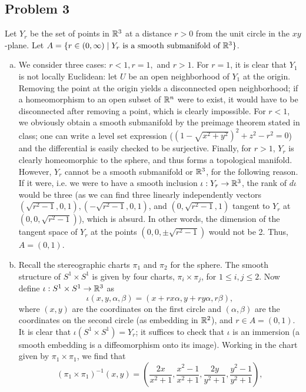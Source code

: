 \documentclass{../mathnotes}
\begin{document}
\subsection*{Problem 3}
Let $Y_r$ be the set of points in $\mathbb{R}^3$ at a distance $r>0$ from the unit circle in the $xy$-plane.
Let $A=\{r\in(0,\infty)\mid Y_r\text{ is a smooth submanifold of }\mathbb{R}^3\}$.
\begin{enumerate}[(a)]
    \item We consider three cases: $r<1, r=1,$ and $r>1$. For $r=1$, it is clear that $Y_1$ is not locally
        Euclidean: let $U$ be an open neighborhood of $Y_1$ at the origin. Removing the point at the origin
        yields a disconnected open neighborhood; if a homeomorphism to an open subset of $\mathbb{R}^n$ were to
        exist, it would have to be disconnected after removing a point, which is clearly impossible. For
        $r<1$, we obviously obtain a smooth submanifold by the preimage theorem stated in class; one can
        write a level set expression ($(1-\sqrt{x^2+y^2})^2+z^2-r^2=0$) and the differential is easily
        checked to be surjective. Finally, for $r>1$, $Y_r$ is clearly homeomorphic to the sphere, and thus
        forms a topological manifold. However, $Y_r$ cannot be a smooth submanifold or $\mathbb{R}^3$, for the following
        reason. If it were, i.e. we were to have a smooth inclusion $\iota:Y_r\to\mathbb{R}^3$, the rank of $d\iota$
        would be three (as we can find three linearly independently vectors
        $(\sqrt{r^2-1},0,1),(-\sqrt{r^2-1},0,1)$, and $(0,\sqrt{r^2-1},1)$ tangent to $Y_r$ at $(0,0,\sqrt{r^2-1})$),
        which is absurd. In other words, the dimension of the tangent space of $Y_r$ at the points
        $(0,0,\pm\sqrt{r^2-1})$ would not be 2. Thus, $A=(0,1)$.
    \item Recall the stereographic charts $\pi_1$ and $\pi_2$ for the sphere. The smooth structure
        of $S^1\times S^1$ is given by four charts, $\pi_i\times\pi_j$, for $1\leq i,j\leq2$.
        Now define $\iota:S^1\times S^1\to\mathbb{R}^3$ as
        \[\iota(x,y,\alpha,\beta)=(x+rx\alpha,y+ry\alpha,r\beta),\]
        where $(x,y)$ are the coordinates on the first circle and $(\alpha,\beta)$ are the coordinates on
        the second circle (as embedding in $\mathbb{R}^2$), and $r\in A=(0,1)$. It is clear that $\iota(S^1\times S^1)=Y_r$;
        it suffices to check that $\iota$ is an immersion (a smooth embedding is a diffeomorphism onto its image).
        Working in the chart given by $\pi_1\times\pi_1$, we find that
        \[(\pi_1\times\pi_1)^{-1}(x,y)=\left( \frac{2x}{x^2+1},\frac{x^2-1}{x^2+1},\frac{2y}{y^2+1},\frac{y^2-1}{y^2+1} \right),\]

\end{enumerate}
\end{document}
